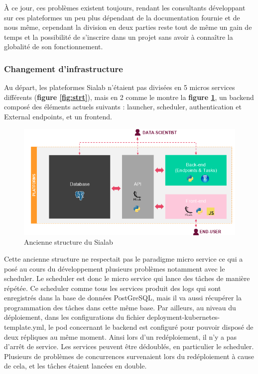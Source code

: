 \documentclass{article} %
\begin{document}
{À ce jour, ces problèmes existent toujours, rendant les consultants développant sur ces plateformes un peu plus dépendant de la documentation fournie et de nous même, cependant la division en deux parties reste tout de même un gain de temps et la possibilité de s'inscrire dans un projet sans avoir à connaître la globalité de son fonctionnement.
 
\subsubsection{Changement d'infrastructure}
Au départ, les plateformes Sialab n'étaient pas divisées en 5 micros services différents (\textbf{figure \ref{fig:strt}}), mais en 2 comme le montre la \textbf{figure \ref{fig:strtold}}, un backend composé des éléments actuels suivants : launcher, scheduler, authentication et External endpoints, et un frontend. 

\begin{figure}[!h]
 \centering
 \includegraphics[keepaspectratio = true,scale=0.6]{structancienne.png}
 \caption{Ancienne structure du Sialab}
 \label{fig:strtold}
\end{figure}

Cette ancienne structure ne respectait pas le paradigme micro service ce qui a posé au cours du développement plusieurs problèmes notamment avec le scheduler. Le scheduler est donc le micro service qui lance des tâches de manière répétée. Ce scheduler comme tous les services produit des logs qui sont enregistrés dans la base de données PostGreSQL, mais il va aussi récupérer la programmation des tâches dans cette même base. Par ailleurs, au niveau du déploiement, dans les configurations du fichier deployment-kubernetes-template.yml, le pod concernant le backend est configuré pour pouvoir disposé de deux répliques au même moment. Ainsi lors d'un redéploiement, il n'y a pas d'arrêt de service. Les services peuvent être dédoublés, en particulier le scheduler. Plusieurs de problèmes de concurrences survenaient lors du redéploiement à cause de cela, et les tâches étaient lancées en double.\\

}
\end{document}
